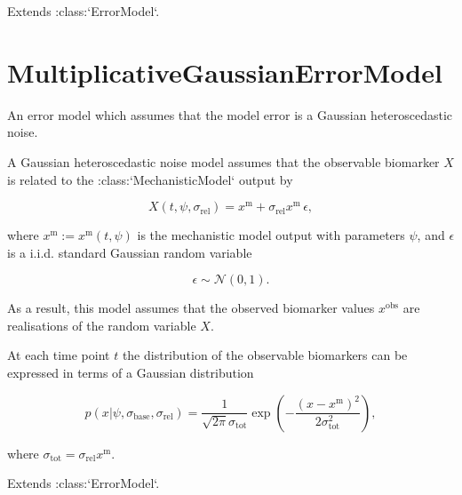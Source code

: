 \documentclass{article}
\begin{document}
    Extends :class:`ErrorModel`.

\section{MultiplicativeGaussianErrorModel}
    An error model which assumes that the model error is a Gaussian
    heteroscedastic noise.

    A Gaussian heteroscedastic noise model assumes that the observable
    biomarker $X$ is related to the :class:`MechanisticModel`
    output by

    $$
        X(t, \psi , \sigma _{\text{rel}}) =
        x^{\text{m}} + \sigma _{\text{rel}} x^{\text{m}} \, \epsilon ,
    $$

    where $x^{\text{m}} := x^{\text{m}}(t, \psi )$ is the mechanistic
    model output with parameters $\psi$, and $\epsilon$ is a
    i.i.d. standard Gaussian random variable

    $$
        \epsilon \sim \mathcal{N}(0, 1).
    $$

    As a result, this model assumes that the observed biomarker values
    $x^{\text{obs}}$ are realisations of the random variable
    $X$.

    At each time point $t$ the distribution of the observable biomarkers
    can be expressed in terms of a Gaussian distribution

    $$
        p(x | \psi , \sigma _{\text{base}}, \sigma _{\text{rel}}) =
        \frac{1}{\sqrt{2\pi} \sigma _{\text{tot}}}
        \exp{\left(-\frac{\left(x-x^{\text{m}}\right) ^2}
        {2\sigma^2 _{\text{tot}}} \right)},
    $$

    where $\sigma _{\text{tot}} = \sigma _{\text{rel}}x^{\text{m}}$.

    Extends :class:`ErrorModel`.
\end{document}
